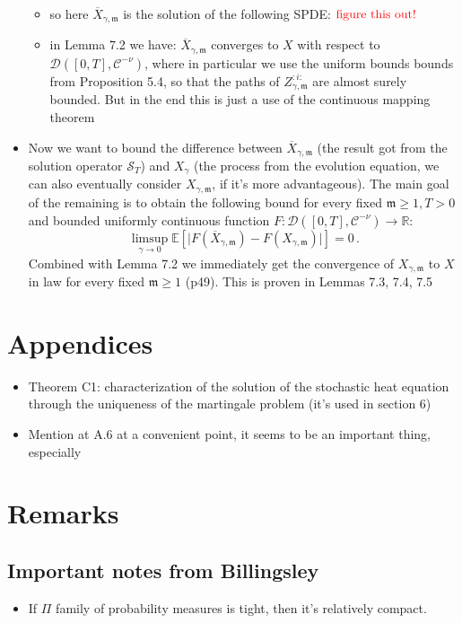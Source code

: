 \documentclass{report}
\theoremstyle{remark}
\theoremstyle{definition}
\begin{document}
\begin{itemize}
  \begin{itemize}
    \item so here $\overline{X}_{\gamma, \mathfrak{m}}$ is the solution of the following SPDE: $\textcolor{red}{\text{figure this out!}}$ 
    \item in Lemma 7.2 we have: $\overline{X}_{\gamma, \mathfrak{m}}$ converges to $X$ with respect to $\mathcal{D}([0, T], \mathcal{C}^{-\nu})$, where in particular we use the uniform bounds bounds from Proposition 5.4, so that the paths of $Z_{\gamma, \mathfrak{m}}^{:i:}$ are almost surely bounded. But in the end this is just a use of the continuous mapping theorem
  \end{itemize}
  \item Now we want to bound the difference between $\overline{X}_{\gamma, \mathfrak{m}}$ (the result got from the solution operator $\mathcal{S}_T$) and $X_\gamma$ (the process from the evolution equation, we can also eventually consider $X_{\gamma, \mathfrak{m}}$, if it's more advantageous). The main goal of the remaining is to obtain the following bound for every fixed $\mathfrak{m} \ge 1, T > 0$ and bounded uniformly continuous function $F: \mathcal{D}([0, T], \mathcal{C}^{-\nu}) \to \mathbb{R}$: $$\limsup_{\gamma \to 0} \mathbb{E}\left[\lvert F(\overline{X}_{\gamma, \mathfrak{m}}) - F({X}_{\gamma, \mathfrak{m}})\rvert\right] = 0\,.$$Combined with Lemma 7.2 we immediately get the convergence of ${X}_{\gamma, \mathfrak{m}}$ to $X$ in law for every fixed $\mathfrak{m} \ge 1$ (p49). This is proven in Lemmas 7.3, 7.4, 7.5
\end{itemize}
\chapter{Appendices}
\begin{itemize}
  \item Theorem C1: characterization of the solution of the stochastic heat equation through the uniqueness of the martingale problem (it's used in section 6)
  \item Mention at A.6 at a convenient point, it seems to be an important thing, especially 
\end{itemize}


\chapter{Remarks}
\section{Important notes from Billingsley}
\begin{itemize}
  \item If $\Pi$ family of probability measures is tight, then it's relatively compact.
\end{itemize}
\end{document}
